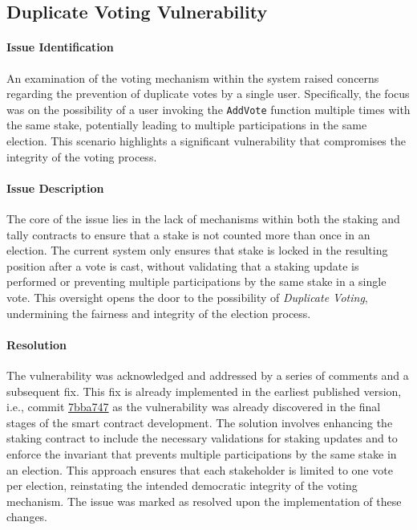 \documentclass[11pt]{article}
\begin{document}
\subsection{Duplicate Voting Vulnerability}

\paragraph{Issue Identification}
An examination of the voting mechanism within the system raised concerns regarding the prevention of duplicate votes by a single user.
Specifically, the focus was on the possibility of a user invoking the \texttt{AddVote} function multiple times with the same stake, potentially leading to multiple participations in the same election.
This scenario highlights a significant vulnerability that compromises the integrity of the voting process.

\paragraph{Issue Description}
The core of the issue lies in the lack of mechanisms within both the staking and tally contracts to ensure that a stake is not counted more than once in an election.
The current system only ensures that stake is locked in the resulting position after a vote is cast, without validating that a staking update is performed or preventing multiple participations by the same stake in a single vote.
This oversight opens the door to the possibility of \textit{Duplicate Voting}, undermining the fairness and integrity of the election process.

\paragraph{Resolution}
The vulnerability was acknowledged and addressed by a series of comments and a subsequent fix. This fix is already implemented in the earliest published version, i.e., commit \href{https://github.com/MuesliSwapTeam/muesliswap-atala-onchain-governance/commit/7bba7477828ae2b44ff7acc6335f0f2df080b41e}{7bba747} as the vulnerability was already discovered in the final stages of the smart contract development. The solution involves enhancing the staking contract to include the necessary validations for staking updates and to enforce the invariant that prevents multiple participations by the same stake in an election.
This approach ensures that each stakeholder is limited to one vote per election, reinstating the intended democratic integrity of the voting mechanism.
The issue was marked as resolved upon the implementation of these changes.
\end{document}
